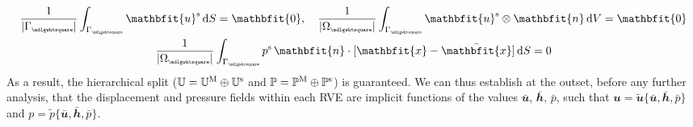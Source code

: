 \documentclass[12pt,a4paper]{article}
\renewcommand{\ta}[1]{\mathbfit{#1}}
\renewcommand{\ts}[1]{\mathbfit{#1}}
\renewcommand{\Box}{\mdlgwhtsquare}
\newcommand{\volume}{|\Omega_\rve|}
\newcommand{\rve}{
  {\mathchoice
   {\mbox{\scalebox{0.67}{$\Box$}}}
   {\mbox{\scalebox{0.67}{$\Box$}}}
   {\mbox{\scalebox{0.5}{$\Box$}}}
   {\mbox{\scalebox{0.375}{$\Box$}}}
  }
}
\begin{document}
\begin{subequations}\label{eq13}
\begin{gather}
    \frac{1}{|\Gamma_\rve|} \int_{\Gamma_\rve} \ta{u}^\fluct \dif S = \ta 0, \quad
    \frac{1}{\volume} \int_{\Gamma_\rve} \ta{u}^\fluct \outerp \ta n \dif V = \ts 0
\label{eq14a} \\
    \frac{1}{\volume} \int_{\Gamma_\rve} p^\fluct\,\ta n \cdot [\ta x-\bar{\ta x}] \dif S = 0
\label{eq14b}
\end{gather}
\end{subequations}
As a result, the hierarchical split ($\mathbb{U} = \mathbb{U}^{\mathrm{M}} \oplus \mathbb{U}^{\mathrm{s}}$ and $\mathbb{P} = \mathbb{P}^{\mathrm{M}} \oplus \mathbb{P}^{\mathrm{s}}$) is guaranteed.
We can thus establish at the outset, before any further analysis, that the displacement and pressure fields within each RVE are implicit functions of the values $\bar{\ta u}$, $\bar{\ts h}$, $\bar{p}$, such that $\ta u = \tilde{\ta u}\{\bar{\ta u}, \bar{\ts h}, \bar{p}\}$ and $p = \tilde{p}\{\bar{\ta u}, \bar{\ts h}, \bar{p}\}$.
\end{document}

